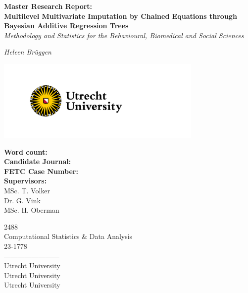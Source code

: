 \documentclass[10pt, a4paper, titlepage]{article}
\begin{document}
\begin{titlingpage}
\begin{center}
\Huge\textbf{Master Research Report:  \\ Multilevel Multivariate Imputation by Chained Equations through Bayesian Additive Regression Trees} \\
\Large\textit{Methodology and Statistics for the Behavioural, Biomedical and Social Sciences}

\vspace{.5cm}

\normalsize\textit{Heleen Brüggen}

\vspace{11.5cm}

\begin{minipage}{.5\textwidth}
\begin{center}
        \includegraphics[width=10cm]{graphs/UU_logo_2021_EN_RGB.png}
\end{center}
\end{minipage}%

\vspace{.25cm}

\begin{minipage}{0.5\textwidth}
\begin{flushleft}

\textbf{Word count:} \\
\textbf{Candidate Journal:} \\
\textbf{FETC Case Number:} \\
\textbf{Supervisors:} \\
MSc. T. Volker \\
Dr. G. Vink \\
MSc. H. Oberman
\end{flushleft}
\end{minipage}%
\begin{minipage}{0.5\textwidth}
\begin{flushright}

2488 \\
Computational Statistics \& Data Analysis \\
23-1778 \\
------------------------\\
Utrecht University \\
Utrecht University \\
Utrecht University
\end{flushright}
\end{minipage}

\end{center}
\end{titlingpage}
\end{document}
